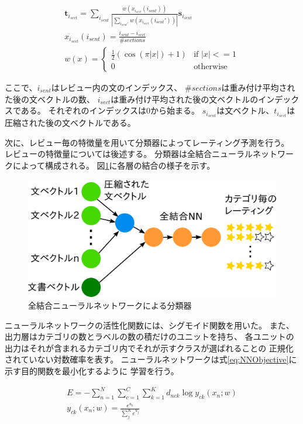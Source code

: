 \documentclass[twocolumn,a4paper]{ltjarticle}
\makeatletter
\let\tti@includegraphics\includegraphics
\renewcommand{\includegraphics}[1]{%
    \tti@includegraphics[width=\linewidth]{#1}}
\makeatother
\begin{document}
\begin{gather}
  \mathbf{t}_{i_{sect}} = \sum_{i_{sent}}
                          \frac{w(x_{i_{sect}}(i_{sent}))}
                               {|\sum_{i_{sent}'} w(x_{i_{sect}}(i_{sent}'))|}
                          \mathbf{s}_{i_{sent}} \\
  x_{i_{sect}}(i_{sent}) = \frac{i_{sent} - i_{sect}}{\#sections} \\
  w(x) = \begin{cases}
    \frac{1}{2} (\cos(\pi|x|) + 1) &\text{if $|x| <= 1$} \\
    0 &\text{otherwise}
  \end{cases}
\end{gather}

ここで、$i_{sent}$はレビュー内の文のインデックス、
$\#sections$は重み付け平均された後の文ベクトルの数、
$i_{sect}$は重み付け平均された後の文ベクトルのインデックスである。
それぞれのインデックスは0から始まる。
$s_{i_{sent}}$は文ベクトル、$t_{i_{sect}}$は圧縮された後の文ベクトルである。

次に、レビュー毎の特徴量を用いて分類器によってレーティング予測を行う。
レビューの特徴量については後述する。
分類器は全結合ニューラルネットワークによって構成される。
図\ref{fig:MyModel}に各層の結合の様子を示す。

\begin{figure}
  \includegraphics{fig/model.png}
  \caption{全結合ニューラルネットワークによる分類器}
  \label{fig:MyModel}
\end{figure}

ニューラルネットワークの活性化関数には、シグモイド関数を用いた。
また、出力層はカテゴリの数とラベルの数の積だけのユニットを持ち、
各ユニットの出力はそれが含まれるカテゴリ内でそれが示すクラスが選ばれることの
正規化されていない対数確率を表す。
ニューラルネットワークは式\ref{eq:NNObjective}に示す目的関数を最小化するように
学習を行う。

\begin{gather}
  E = - \sum^{N}_{n = 1} \sum^{C}_{c = 1} \sum^{K}_{k = 1}
        d_{nck} \log{y_{ck}(x_n; w)}
  \label{eq:NNObjective} \\
  y_{ck}(x_n; w) = \frac{e^{u_k}}{\sum^{K}_{j} e^{u_j}}
\end{gather}
\end{document}
